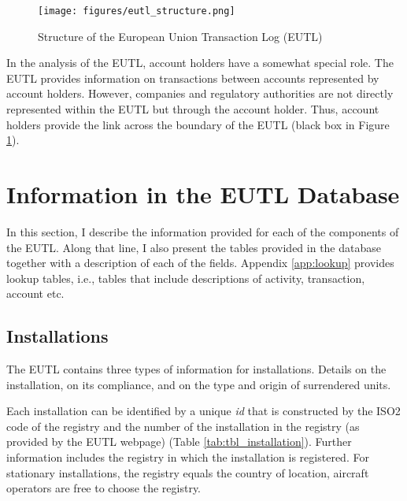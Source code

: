 \documentclass[authoryear]{elsarticle}
\begin{document}
\begin{figure}[!htbp]
	\caption{Structure of the European Union Transaction Log (EUTL)}\label{fig:eutl_strucutre}
	\centering
	\vspace{-2ex}
	\texttt{[image: figures/eutl\_structure.png]}
\end{figure}

In the analysis of the EUTL, account holders have a somewhat special role. The EUTL provides information on transactions between accounts represented by account holders. However, companies and regulatory authorities are not directly represented within the EUTL but through the account holder. Thus, account holders provide the link across the boundary of the EUTL (black box in Figure \ref{fig:eutl_strucutre}). 



\section{Information in the EUTL Database}
In this section, I describe the information provided for each of the components of the EUTL. Along that line, I also present the tables provided in the database together with a description of each of the fields. Appendix \ref{app:lookup} provides lookup tables, i.e., tables that include descriptions of activity, transaction, account etc.

\subsection{Installations}\label{sec:data_installation}

The EUTL contains three types of information for installations. Details on the installation, on its compliance, and on the type and origin of surrendered units.  

Each installation can be identified by a unique \textit{id} that is constructed by the ISO2 code of the registry and the number of the installation in the registry (as provided by the EUTL webpage) (Table \ref{tab:tbl_installation}). Further information includes the registry in which the installation is registered. For stationary installations, the registry equals the country of location, aircraft operators are free to choose the registry. 
\end{document}
